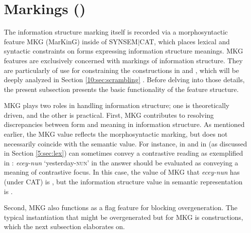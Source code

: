 \largerpage
\section{Markings \textnormal{(}\textnormal{)}}
\label{9:ssec:mkg}

The information structure marking itself is recorded via a
morphosyntactic feature MKG (MarKinG) inside
of \mbox{SYNSEM{$\mid$}CAT}, which places lexical and syntactic
constraints on forms expressing information structure meanings.  MKG
features are exclusively concerned with markings of information
structure. They are particularly of use for constraining the
 constructions in  and ,
which will be deeply analyzed in Section \ref{10:sec:scrambling}
  . Before delving into those details, the
  present subsection presents the basic functionality of the feature
  structure.


MKG plays two roles in handling information structure; one is
theoretically driven, and the other is practical.  First, MKG
contributes to resolving discrepancies between form and meaning in
information structure. As mentioned earlier, the MKG value reflects
the morphosyntactic marking, but does not necessarily coincide with
the semantic value.  For instance, \wa in  and \nun in
 (as discussed in Section \ref{5:sec:lex}) can sometimes convey a
contrastive  reading as exemplified in :
\textit{ecey-nun} `yesterday-\textsc{nun}' in the answer should be
evaluated as conveying a meaning of contrastive focus.  In this case,
the value of MKG that \textit{ecey-nun} has (under CAT) is ,
but the information structure value in semantic representation is
.



\noindent Second, MKG also functions as a flag feature for blocking
overgeneration.  The typical instantiation that might be overgenerated
but for MKG is  constructions, which the next
subsection elaborates on.


